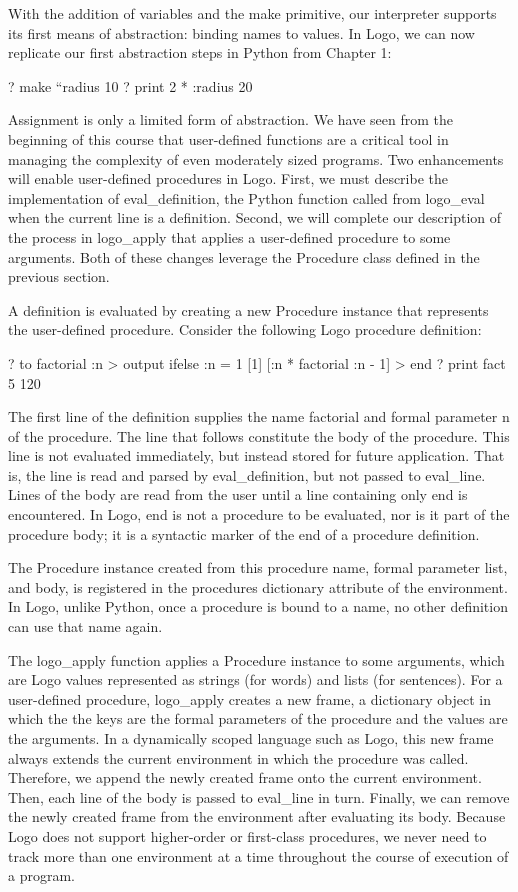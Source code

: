 \documentclass[letterpaper,10pt,dvipdfmx]{sphinxmanual}
\begin{document}
With the addition of variables and the make primitive, our interpreter supports its first means of abstraction: binding names to values. In Logo, we can now replicate our first abstraction steps in Python from Chapter 1:

? make ``radius 10
? print 2 * :radius
20

Assignment is only a limited form of abstraction. We have seen from the beginning of this course that user-defined functions are a critical tool in managing the complexity of even moderately sized programs. Two enhancements will enable user-defined procedures in Logo. First, we must describe the implementation of eval\_definition, the Python function called from logo\_eval when the current line is a definition. Second, we will complete our description of the process in logo\_apply that applies a user-defined procedure to some arguments. Both of these changes leverage the Procedure class defined in the previous section.

A definition is evaluated by creating a new Procedure instance that represents the user-defined procedure. Consider the following Logo procedure definition:

? to factorial :n
\textgreater{} output ifelse :n = 1 {[}1{]} {[}:n * factorial :n - 1{]}
\textgreater{} end
? print fact 5
120

The first line of the definition supplies the name factorial and formal parameter n of the procedure. The line that follows constitute the body of the procedure. This line is not evaluated immediately, but instead stored for future application. That is, the line is read and parsed by eval\_definition, but not passed to eval\_line. Lines of the body are read from the user until a line containing only end is encountered. In Logo, end is not a procedure to be evaluated, nor is it part of the procedure body; it is a syntactic marker of the end of a procedure definition.

The Procedure instance created from this procedure name, formal parameter list, and body, is registered in the procedures dictionary attribute of the environment. In Logo, unlike Python, once a procedure is bound to a name, no other definition can use that name again.

The logo\_apply function applies a Procedure instance to some arguments, which are Logo values represented as strings (for words) and lists (for sentences). For a user-defined procedure, logo\_apply creates a new frame, a dictionary object in which the the keys are the formal parameters of the procedure and the values are the arguments. In a dynamically scoped language such as Logo, this new frame always extends the current environment in which the procedure was called. Therefore, we append the newly created frame onto the current environment. Then, each line of the body is passed to eval\_line in turn. Finally, we can remove the newly created frame from the environment after evaluating its body. Because Logo does not support higher-order or first-class procedures, we never need to track more than one environment at a time throughout the course of execution of a program.
\end{document}
